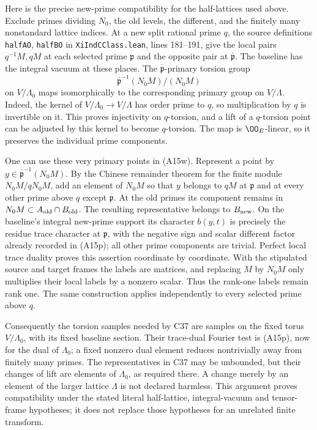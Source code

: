 Here is the precise new-prime compatibility for the half-lattices
used above.  Exclude primes dividing $N_0$, the old levels, the
different, and the finitely many nonstandard lattice indices.
At a new split rational prime $q$, the source definitions
\texttt{halfAO}, \texttt{halfBO} in
\texttt{XiIndCClass.lean}, lines 181--191, give the local pairs
$q^{-1}M,qM$ at each selected prime $\mathfrak p$ and the
opposite pair at $\overline{\mathfrak p}$.
The baseline has the integral vacuum at these places.
The $\overline{\mathfrak p}$-primary torsion group
\[
 \overline{\mathfrak p}^{-1}(N_0M)/(N_0M)
\]
on $V/\Lambda_0$ maps isomorphically to the corresponding
primary group on $V/\Lambda$.
Indeed, the kernel of $V/\Lambda_0\to V/\Lambda$ has order
prime to $q$, so multiplication by $q$ is invertible on it.
This proves injectivity on $q$-torsion, and a lift of a
$q$-torsion point can be adjusted by this kernel to become
$q$-torsion.  The map is $\OO_E$-linear, so it preserves the
individual prime components.

One can use these very primary points in (A15w).
Represent a point by $y\in\overline{\mathfrak p}^{-1}(N_0M)$.
By the Chinese remainder theorem for the finite module
$N_0M/qN_0M$, add an element of $N_0M$ so that $y$ belongs
to $qM$ at $\mathfrak p$ and at every other prime above $q$
except $\overline{\mathfrak p}$.  At the old primes its
component remains in $N_0M\subset A_{\rm old}\cap B_{\rm old}$.
The resulting representative belongs to $B_{\rm new}$.
On the baseline's integral new-prime support its character
$b(y,t)$ is precisely the residue trace character at
$\mathfrak p$, with the negative sign and scalar different
factor already recorded in (A15p); all other prime components
are trivial.  Perfect local trace duality proves this assertion
coordinate by coordinate.  With the stipulated source and target
frames the labels are matrices, and replacing $M$ by $N_0M$
only multiplies their local labels by a nonzero scalar.  Thus the
rank-one labels remain rank one.  The same construction applies
independently to every selected prime above $q$.

Consequently the torsion samples needed by C37 are samples on
the fixed torus $V/\Lambda_0$, with its fixed baseline section.
Their trace-dual Fourier test is (A15p), now for the dual of
$\Lambda_0$; a fixed nonzero dual element reduces nontrivially
away from finitely many primes.  The representatives in C37 may
be unbounded, but their changes of lift are elements of
$\Lambda_0$, as required there.  A change merely by an element
of the larger lattice $\Lambda$ is not declared harmless.
This argument proves compatibility under the stated literal
half-lattice, integral-vacuum and tensor-frame hypotheses; it
does not replace those hypotheses for an unrelated finite
transform.

